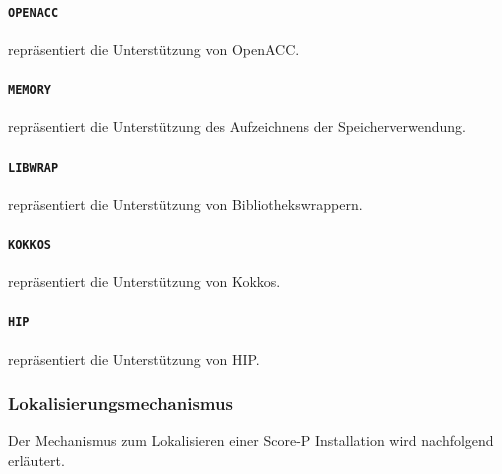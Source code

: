 \documentclass[german,proseminar,hyperref,utf8,lof]{zihpub}
\begin{document}
    \paragraph{\texttt{OPENACC}} repräsentiert die Unterstützung von OpenACC.

    \paragraph{\texttt{MEMORY}} repräsentiert die Unterstützung des Aufzeichnens der Speicherverwendung.

    \paragraph{\texttt{LIBWRAP}} repräsentiert die Unterstützung von Bibliothekswrappern.

    \paragraph{\texttt{KOKKOS}} repräsentiert die Unterstützung von Kokkos.

    \paragraph{\texttt{HIP}} repräsentiert die Unterstützung von HIP.

    \subsubsection{Lokalisierungsmechanismus}
    Der Mechanismus zum Lokalisieren einer Score-P Installation wird nachfolgend erläutert.
\end{document}
